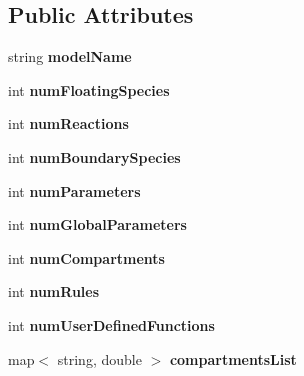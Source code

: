 \subsection*{Public Attributes}
\begin{DoxyCompactItemize}
\item 
\hypertarget{class_s_b_m_l_info_a93b24098dee87dcaba08032b5abc2891}{string {\bfseries model\-Name}}\label{class_s_b_m_l_info_a93b24098dee87dcaba08032b5abc2891}

\item 
\hypertarget{class_s_b_m_l_info_abcd1132a18002de764e09aaa3c06ec9c}{int {\bfseries num\-Floating\-Species}}\label{class_s_b_m_l_info_abcd1132a18002de764e09aaa3c06ec9c}

\item 
\hypertarget{class_s_b_m_l_info_a484b06638330867b6362b3b484e21704}{int {\bfseries num\-Reactions}}\label{class_s_b_m_l_info_a484b06638330867b6362b3b484e21704}

\item 
\hypertarget{class_s_b_m_l_info_a02f40e3f9e75b4242af57f73d87f30fb}{int {\bfseries num\-Boundary\-Species}}\label{class_s_b_m_l_info_a02f40e3f9e75b4242af57f73d87f30fb}

\item 
\hypertarget{class_s_b_m_l_info_ac2e3b49e5e31748a9070a52f4c94c321}{int {\bfseries num\-Parameters}}\label{class_s_b_m_l_info_ac2e3b49e5e31748a9070a52f4c94c321}

\item 
\hypertarget{class_s_b_m_l_info_a6d031bf8f9360fe8a3d5594b8d5e727a}{int {\bfseries num\-Global\-Parameters}}\label{class_s_b_m_l_info_a6d031bf8f9360fe8a3d5594b8d5e727a}

\item 
\hypertarget{class_s_b_m_l_info_af7f0f9b13156674801001b044bac6467}{int {\bfseries num\-Compartments}}\label{class_s_b_m_l_info_af7f0f9b13156674801001b044bac6467}

\item 
\hypertarget{class_s_b_m_l_info_a1d649f7916cb108a17728caee41df462}{int {\bfseries num\-Rules}}\label{class_s_b_m_l_info_a1d649f7916cb108a17728caee41df462}

\item 
\hypertarget{class_s_b_m_l_info_a62d6d2cc73bfca3bf6355fc6dc7e141c}{int {\bfseries num\-User\-Defined\-Functions}}\label{class_s_b_m_l_info_a62d6d2cc73bfca3bf6355fc6dc7e141c}

\item 
\hypertarget{class_s_b_m_l_info_a7d3a09b3aaa72ae7b60abac8e9687b31}{map$<$ string, double $>$ {\bfseries compartments\-List}}\label{class_s_b_m_l_info_a7d3a09b3aaa72ae7b60abac8e9687b31}


\end{DoxyCompactItemize}
